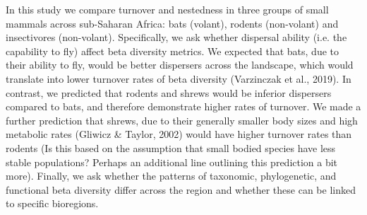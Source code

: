 \documentclass{article}
\begin{document}
\vspace{5mm}
In this study we compare turnover and nestedness in three groups of small mammals across sub-Saharan Africa: bats (volant), rodents (non-volant) and insectivores (non-volant). Specifically, we ask whether dispersal ability (i.e. the capability to fly) affect beta diversity metrics. We expected that bats, due to their ability to fly, would be better dispersers across the landscape, which would translate into lower turnover rates of beta diversity (Varzinczak et al., 2019). In contrast, we predicted that rodents and shrews would be inferior dispersers compared to bats, and therefore demonstrate higher rates of turnover. We made a further prediction that shrews, due to their generally smaller body sizes and high metabolic rates (Gliwicz \& Taylor, 2002) would have higher turnover rates than rodents (Is this based on the assumption that small bodied species have less stable populations? Perhaps an additional line outlining this prediction a bit more). Finally, we ask whether the patterns of taxonomic, phylogenetic, and functional beta diversity differ across the region and whether these can be linked to specific bioregions. %
  

\vspace{5mm}
\end{document}
